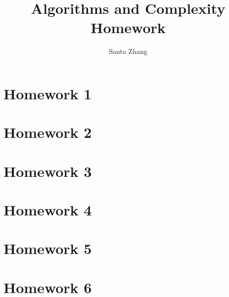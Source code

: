 \documentclass[a4paper, 10pt]{book}
\begin{document}
\author{Santa Zhang}
\title{Algorithms and Complexity Homework}
\maketitle

\tableofcontents

\chapter{Homework 1}


\chapter{Homework 2}


\chapter{Homework 3}


\chapter{Homework 4}


\chapter{Homework 5}


\chapter{Homework 6}

\end{document}
